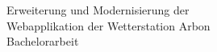 \begin{titlepage}

\begin{center}
	\vspace{6cm}
	\textsf{\Huge Erweiterung und Modernisierung der} \\
	\vspace{3mm}
	\textsf{\Huge Webapplikation der Wetterstation Arbon} \\
	\vspace{15mm}
	\textsf{\LARGE{Bachelorarbeit}}\\
\end{center}



\end{titlepage}
